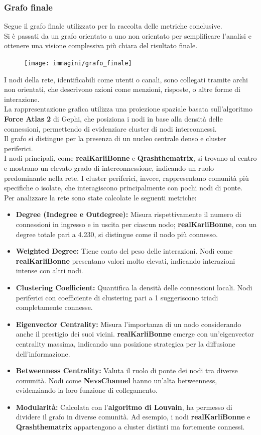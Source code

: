 \documentclass[12pt]{article}
\begin{document}
	\subsubsection{Grafo finale}
	Segue il grafo finale utilizzato per la raccolta delle metriche conclusive.\\
	Si è passati da un grafo orientato a uno non orientato per semplificare l'analisi e ottenere una visione complessiva più chiara del risultato finale.
	\begin{figure}[H]
	\centering
	\texttt{[image: immagini/grafo\_finale]}
	\end{figure}
	I nodi della rete, identificabili come utenti o canali, sono collegati tramite archi non orientati, che descrivono azioni come menzioni, risposte, o altre forme di interazione. \\
	La rappresentazione grafica utilizza una proiezione spaziale basata sull'algoritmo \textbf{Force Atlas 2} di Gephi, che posiziona i nodi in base alla densità delle connessioni, permettendo di evidenziare cluster di nodi interconnessi.\\
	Il grafo si distingue per la presenza di un nucleo centrale denso e cluster periferici.\\
	I nodi principali, come \textbf{realKarliBonne} e \textbf{Qrashthematrix}, si trovano al centro e mostrano un elevato grado di interconnessione, indicando un ruolo predominante nella rete. I cluster periferici, invece, rappresentano comunità più specifiche o isolate, che interagiscono principalmente con pochi nodi di ponte.\\
	Per analizzare la rete sono state calcolate le seguenti metriche:
	\begin{itemize}[label=]
		\item \textbf{Degree (Indegree e Outdegree):} Misura rispettivamente il numero di connessioni in ingresso e in uscita per ciascun nodo; \textbf{realKarliBonne}, con un degree totale pari a 4.230, si distingue come il nodo più connesso.
		\item \textbf{Weighted Degree:} Tiene conto del peso delle interazioni. Nodi come \textbf{realKarliBonne} presentano valori molto elevati, indicando interazioni intense con altri nodi.
		\item \textbf{Clustering Coefficient:} Quantifica la densità delle connessioni locali. Nodi periferici con coefficiente di clustering pari a 1 suggeriscono triadi completamente connesse.
		\item \textbf{Eigenvector Centrality:} Misura l'importanza di un nodo considerando anche il prestigio dei suoi vicini. \textbf{realKarliBonne} emerge con un'eigenvector centrality massima, indicando una posizione strategica per la diffusione dell'informazione.
		\item \textbf{Betweenness Centrality:} Valuta il ruolo di ponte dei nodi tra diverse comunità. Nodi come \textbf{NevsChannel} hanno un'alta betweenness, evidenziando la loro funzione di collegamento.
		\item \textbf{Modularità:} Calcolata con l'\textbf{algoritmo di Louvain}, ha permesso di dividere il grafo in diverse comunità. Ad esempio, i nodi \textbf{realKarliBonne} e \textbf{Qrashthematrix }appartengono a cluster distinti ma fortemente connessi.
	\end{itemize} 
\end{document}
